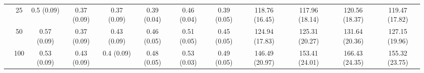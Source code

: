 \documentclass[11pt]{article}
\theoremstyle{definition}
\begin{document}
\begin{table}[H]
\begin{center}
{\begin{tabular}{cc|ccc|ccc|cccc|}
  & 25  & 0.5 (0.09) & 0.37 (0.09) & 0.37 (0.09) & 0.39 (0.04) & 0.46 (0.04) & 0.39 (0.05) & 118.76 (16.45) & 117.96 (18.14) & 120.56 (18.37) & 119.47 (17.82) \\ 
 & 50  & 0.57 (0.09) & 0.37 (0.09) & 0.43 (0.09) & 0.46 (0.05) & 0.51 (0.05) & 0.45 (0.05) & 124.94 (17.83) & 125.31 (20.27) & 131.64 (20.36) & 127.15 (19.96) \\ 
  & 100  & 0.53 (0.09) & 0.43 (0.09) & 0.4 (0.09) & 0.48 (0.05) & 0.53 (0.03) & 0.49 (0.05) & 146.49 (20.97) & 153.41 (24.01) & 166.43 (24.35) & 155.32 (23.75) \\ 
\end{tabular}}
   \end{center}
      \vspace{-.5cm}
\end{table}
\end{document}
